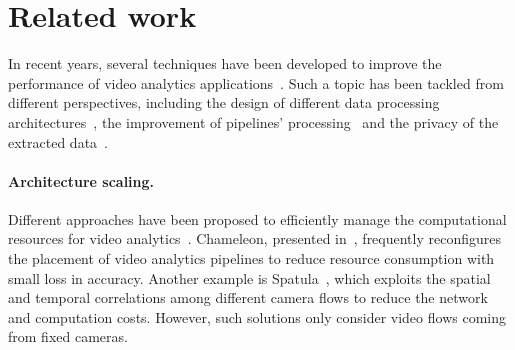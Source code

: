 \section{Related work}

In recent years, several techniques have been developed to improve the performance of video analytics applications~\cite{ibrahim2021survey,xu2023edge,hu2023edge}. Such a topic has been tackled from different perspectives, including the design of different data processing architectures~\cite{jain2020spatula,zhang2017live,jiang2018chameleon}, the improvement of pipelines' processing~\cite{fouladi2017encoding,chen2015glimpse,padmanabhan2021towards,padmanabhan2023gemel} and the privacy of the extracted data~\cite{cangialosi2022privid,poddar2020visor,wu2021pecam}. 

\paragraph{Architecture scaling.} Different approaches have been proposed to efficiently manage the computational resources for video analytics~\cite{jain2020spatula,zhang2017live,jiang2018chameleon,201465videostorm}. Chameleon, presented in~\cite{jiang2018chameleon}, frequently reconfigures the placement of video analytics pipelines to reduce resource consumption with small loss in accuracy. Another example is Spatula~\cite{jain2020spatula}, which exploits the spatial and temporal correlations among different camera flows to reduce the network and computation costs. However, such solutions only consider video flows coming from fixed cameras.


